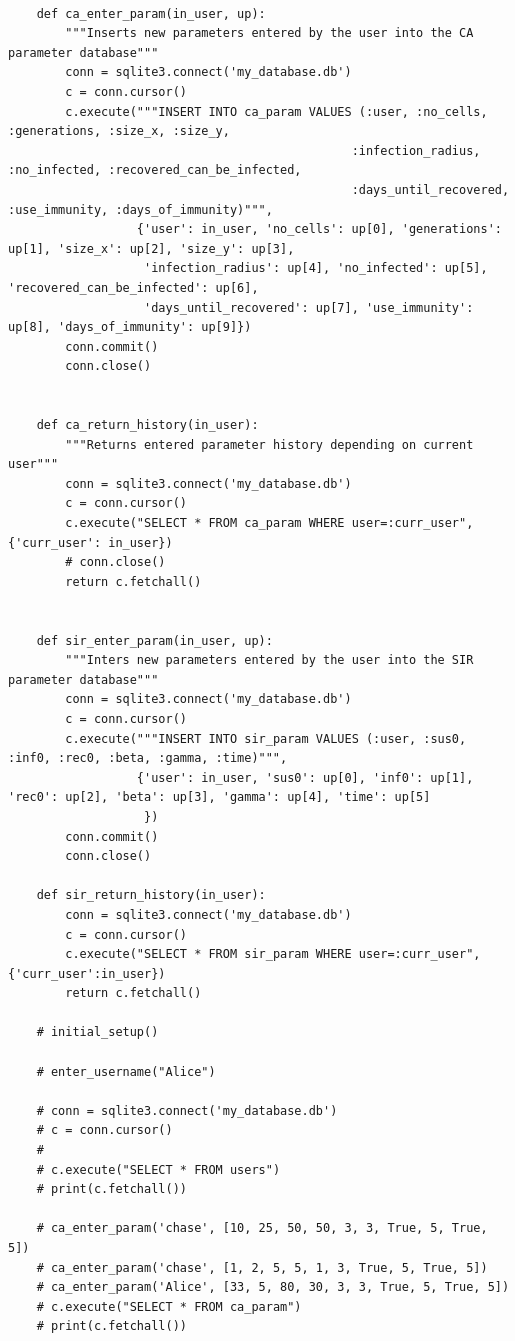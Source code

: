 \documentclass[11pt, a4paper]{article}
\begin{document}
\begin{lstlisting}
    
    def ca_enter_param(in_user, up):
        """Inserts new parameters entered by the user into the CA parameter database"""
        conn = sqlite3.connect('my_database.db')
        c = conn.cursor()
        c.execute("""INSERT INTO ca_param VALUES (:user, :no_cells, :generations, :size_x, :size_y,
                                                :infection_radius, :no_infected, :recovered_can_be_infected,
                                                :days_until_recovered, :use_immunity, :days_of_immunity)""",
                  {'user': in_user, 'no_cells': up[0], 'generations': up[1], 'size_x': up[2], 'size_y': up[3],
                   'infection_radius': up[4], 'no_infected': up[5], 'recovered_can_be_infected': up[6],
                   'days_until_recovered': up[7], 'use_immunity': up[8], 'days_of_immunity': up[9]})
        conn.commit()
        conn.close()
    
    
    def ca_return_history(in_user):
        """Returns entered parameter history depending on current user"""
        conn = sqlite3.connect('my_database.db')
        c = conn.cursor()
        c.execute("SELECT * FROM ca_param WHERE user=:curr_user", {'curr_user': in_user})
        # conn.close()
        return c.fetchall()
    
    
    def sir_enter_param(in_user, up):
        """Inters new parameters entered by the user into the SIR parameter database"""
        conn = sqlite3.connect('my_database.db')
        c = conn.cursor()
        c.execute("""INSERT INTO sir_param VALUES (:user, :sus0, :inf0, :rec0, :beta, :gamma, :time)""",
                  {'user': in_user, 'sus0': up[0], 'inf0': up[1], 'rec0': up[2], 'beta': up[3], 'gamma': up[4], 'time': up[5]
                   })
        conn.commit()
        conn.close()
    
    def sir_return_history(in_user):
        conn = sqlite3.connect('my_database.db')
        c = conn.cursor()
        c.execute("SELECT * FROM sir_param WHERE user=:curr_user", {'curr_user':in_user})
        return c.fetchall()
    
    # initial_setup()
    
    # enter_username("Alice")
    
    # conn = sqlite3.connect('my_database.db')
    # c = conn.cursor()
    #
    # c.execute("SELECT * FROM users")
    # print(c.fetchall())
    
    # ca_enter_param('chase', [10, 25, 50, 50, 3, 3, True, 5, True, 5])
    # ca_enter_param('chase', [1, 2, 5, 5, 1, 3, True, 5, True, 5])
    # ca_enter_param('Alice', [33, 5, 80, 30, 3, 3, True, 5, True, 5])
    # c.execute("SELECT * FROM ca_param")
    # print(c.fetchall())
    
    
\end{lstlisting}

\newpage

% 
\end{document}
